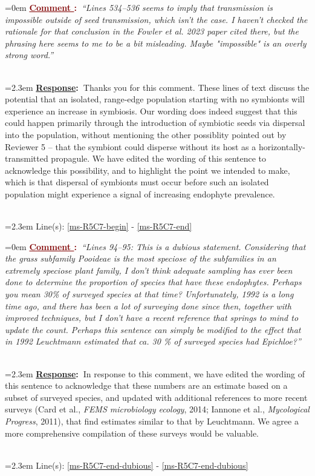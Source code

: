 \documentclass[12pt]{article}
\newcounter{cN}
\newcommand{\comment}[1]{
	\vspace{2em}
	\refstepcounter{cN} %
	\noindent \hangindent=0em \textbf{\textcolor{Maroon}{\uline{Comment \thecN}:~}}\emph{``#1''}
	}
\newcommand{\response}[1]{
	\\[0.25em]
	\hangindent=2.3em \textbf{\textcolor{NavyBlue}{\uline{Response}:~}}#1
	}
\newcommand{\linesref}[2]{
		\\[0.25em]
	\hangindent=2.3em {\color{Mahogany} Line(s): \ref{#1} - \ref{#2}}
}
\begin{document}
\comment{Lines 534–536 seems to imply that transmission is impossible outside of seed transmission, which isn't the case. I haven't checked the rationale for that conclusion in the Fowler et al. 2023 paper cited there, but the phrasing here seems to me to be a bit misleading. Maybe "impossible" is an overly strong word.}
\response{Thanks you for this comment. These lines of text discuss the potential that an isolated, range-edge population starting with no symbionts will experience an increase in symbiosis. Our wording does indeed suggest that this could happen primarily through the introduction of symbiotic seeds via dispersal into the population, without mentioning the other possiblity pointed out by Reviewer 5 -- that the symbiont could disperse without its host as a horizontally-transmitted propagule. We have edited the wording of this sentence to acknowledge this possibility, and to highlight the point we intended to make, which is that dispersal of symbionts must occur before such an isolated population might experience a signal of increasing endophyte prevalence.}
\linesref{ms-R5C7-begin}{ms-R5C7-end}

\comment{Lines 94–95: This is a dubious statement. Considering that the grass subfamily Pooideae is the most speciose of the subfamilies in an extremely speciose plant family, I don't think adequate sampling has ever been done to determine the proportion of species that have these endophytes. Perhaps you mean 30\% of surveyed species at that time? Unfortunately, 1992 is a long time ago, and there has been a lot of surveying done since then, together with improved techniques, but I don't have a recent reference that springs to mind to update the count. Perhaps this sentence can simply be modified to the effect that in 1992 Leuchtmann estimated that ca. 30 \% of surveyed species had Epichloe?}
\response{In response to this comment, we have edited the wording of this sentence to acknowledge that these numbers are an estimate based on a subset of surveyed species, and updated with additional references to more recent surveys (Card et al., \emph{FEMS microbiology ecology}, 2014; Iannone et al., \emph{Mycological Progress}, 2011), that find estimates similar to that by Leuchtmann. We agree a more comprehensive compilation of these surveys would be valuable.}
\linesref{ms-R5C7-end-dubious}{ms-R5C7-end-dubious}
\end{document}
